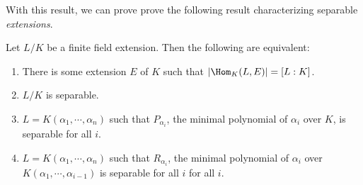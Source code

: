 \documentclass[a4paper]{article}
\begin{document}
With this result, we can prove prove the following result characterizing separable \emph{extensions}.
\begin{thm}
  Let $L/K$ be a finite field extension. Then the following are equivalent:
  \begin{enumerate}
    \item There is some extension $E$ of $K$ such that $|\Hom_K(L, E)| = [L:K]$.
    \item $L/K$ is separable.
    \item $L = K(\alpha_1, \cdots, \alpha_n)$ such that $P_{\alpha_i}$, the minimal polynomial of $\alpha_i$ over $K$, is separable for all $i$.
    \item $L = K(\alpha_1, \cdots, \alpha_n)$ such that $R_{\alpha_i}$, the minimal polynomial of $\alpha_i$ over $K(\alpha_1, \cdots, \alpha_{i - 1})$ is separable for all $i$ for all $i$.
  \end{enumerate}
\end{thm}
\end{document}
